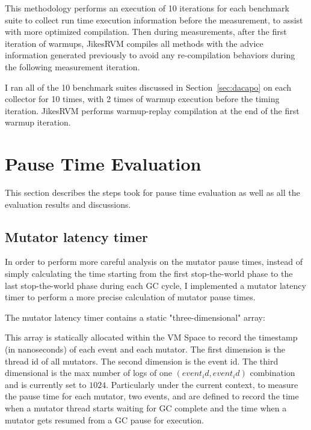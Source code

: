 This methodology performs an execution of 10 iterations for each benchmark suite to
collect run time execution information before the measurement, to assist with more optimized compilation.
Then during measurements, after the first iteration of warmups, JikesRVM compiles all
methods with the advice information generated previously to avoid any re-compilation
behaviors during the following measurement iteration.

I ran all of the 10 benchmark suites discussed in Section~\ref{sec:dacapo} on each collector
for 10 times, with 2 times of warmup execution before the timing iteration.
JikesRVM performs warmup-replay compilation at the end of the first warmup iteration.

\section{Pause Time Evaluation} %
\label{sec:pausetime}

This section describes the steps took for pause time evaluation as well as
all the evaluation results and discussions.

\subsection{Mutator latency timer}

In order to perform more careful analysis on the mutator pause times, instead of
simply calculating the time starting from the first stop-the-world phase to the last
stop-the-world phase during each GC cycle, I implemented a mutator latency timer
to perform a more precise calculation of mutator pause times.

The mutator latency timer contains a static "three-dimensional" array:\\
\centerline{}
This array is statically allocated within the VM Space to record the timestamp (in nanoseconds)
of each event and each mutator. The first dimension is the thread id of all
mutators. The second dimension is the event id. The third dimensional  is the
max number of logs of one $(event_id, event_id)$ combination and is currently set to $1024$. Particularly under
the current context, to measure the pause time for each mutator, two events,
 and  are defined to record the time when a
mutator thread starts waiting for GC complete and the time when a mutator gets resumed from a GC pause for execution.

